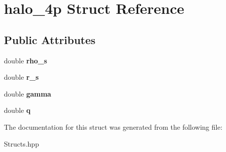\hypertarget{structhalo__4p}{}\section{halo\+\_\+4p Struct Reference}
\label{structhalo__4p}
\subsection*{Public Attributes}
\begin{DoxyCompactItemize}
\item 
\mbox{\label{structhalo__4p_a174a0b98a3c671793ea2f7591f14bd55}} 
double {\bfseries rho\+\_\+s}
\item 
\mbox{\label{structhalo__4p_aaf669aa374232d2b3aa76d7814171c77}} 
double {\bfseries r\+\_\+s}
\item 
\mbox{\label{structhalo__4p_aa6e000d6c31701d2ed2d76b08e9fa7f9}} 
double {\bfseries gamma}
\item 
\mbox{\label{structhalo__4p_aa7de722d31c2b128e25a2979f9829232}} 
double {\bfseries q}
\end{DoxyCompactItemize}


The documentation for this struct was generated from the following file\+:\begin{DoxyCompactItemize}
\item 
Structs.\+hpp\end{DoxyCompactItemize}
